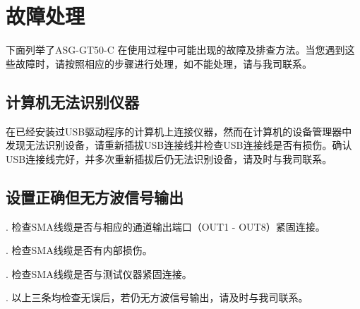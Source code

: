 \chapter{\heiti 故障处理}
下面列举了ASG-GT50-C 在使用过程中可能出现的故障及排查方法。当您遇到这些故障时，请按照相应的步骤进行处理，如不能处理，请与我司联系。

\section{\heiti 计算机无法识别仪器}
在已经安装过USB驱动程序的计算机上连接仪器，然而在计算机的设备管理器中发现无法识别设备，请重新插拔USB连接线并检查USB连接线是否有损伤。确认USB连接线完好，并多次重新插拔后仍无法识别设备，请及时与我司联系。

\section{\heiti 设置正确但无方波信号输出}
. 检查SMA线缆是否与相应的通道输出端口（OUT1 - OUT8）紧固连接。

. 检查SMA线缆是否有内部损伤。

. 检查SMA线缆是否与测试仪器紧固连接。

. 以上三条均检查无误后，若仍无方波信号输出，请及时与我司联系。

